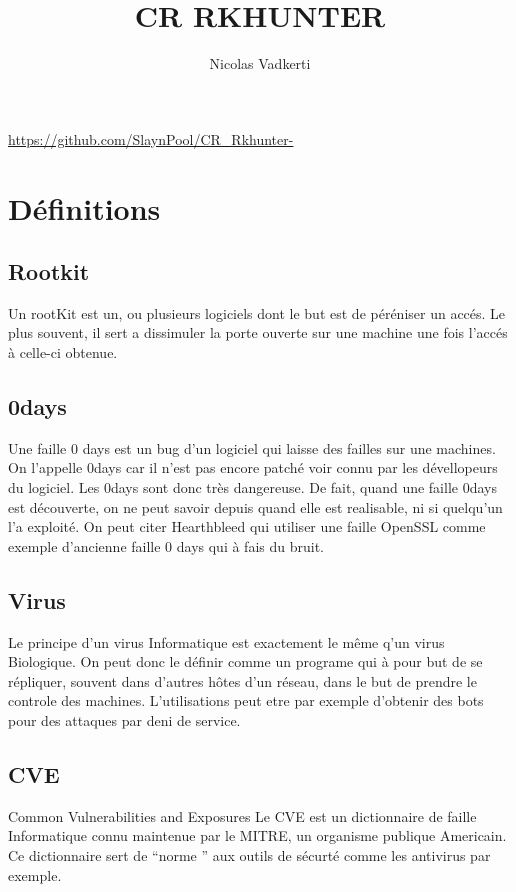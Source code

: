 \documentclass[10pt,a4paper]{article}
\title{CR RKHUNTER}
\author{Nicolas Vadkerti}
\begin{document}
\maketitle


\url{https://github.com/SlaynPool/CR_Rkhunter-}


\section{Définitions}
\subsection{Rootkit}
Un rootKit est un, ou plusieurs logiciels dont le but est de péréniser un accés. Le plus souvent, il sert a dissimuler la porte ouverte sur une machine une fois l'accés à celle-ci obtenue. 
\subsection{0days}
Une faille 0 days est un bug d'un logiciel qui laisse des failles sur une machines. On l'appelle 0days car il n'est pas encore patché voir connu par les dévellopeurs du logiciel. Les 0days sont donc très dangereuse. De fait, quand une faille 0days est découverte, on ne peut savoir depuis quand elle est realisable, ni si quelqu'un l'a exploité.
On peut citer Hearthbleed qui utiliser une faille OpenSSL comme exemple d'ancienne faille 0 days qui à fais du bruit.


\subsection{Virus}

Le principe d'un virus Informatique est exactement le même q'un virus Biologique. On peut donc le définir comme un programe qui à pour but de se répliquer, souvent dans d'autres hôtes d'un réseau, dans le but de prendre le controle des machines. L'utilisations peut etre par exemple d'obtenir des bots pour des attaques par deni de service.




\subsection{CVE}

 Common Vulnerabilities and Exposures
 Le CVE est un dictionnaire de faille Informatique connu maintenue par le MITRE, un organisme publique Americain.
 Ce dictionnaire sert de ``norme '' aux outils de sécurté comme les antivirus par exemple.
 
\end{document}
